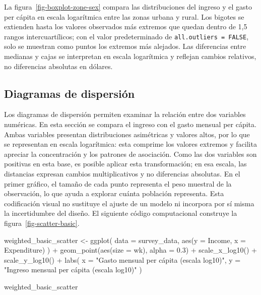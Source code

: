 \documentclass[
  spanish,
  11pt,
  letterpaper,
  oneside,
  open=any]{scrbook}
\newenvironment{Shaded}{\begin{snugshade}}{\end{snugshade}}
\newcommand{\AttributeTok}[1]{\textcolor[rgb]{0.40,0.45,0.13}{#1}}
\newcommand{\FloatTok}[1]{\textcolor[rgb]{0.68,0.00,0.00}{#1}}
\newcommand{\FunctionTok}[1]{\textcolor[rgb]{0.28,0.35,0.67}{#1}}
\newcommand{\NormalTok}[1]{\textcolor[rgb]{0.00,0.23,0.31}{#1}}
\newcommand{\OtherTok}[1]{\textcolor[rgb]{0.00,0.23,0.31}{#1}}
\newcommand{\SpecialCharTok}[1]{\textcolor[rgb]{0.37,0.37,0.37}{#1}}
\newcommand{\StringTok}[1]{\textcolor[rgb]{0.13,0.47,0.30}{#1}}
\begin{document}
La figura~\ref{fig-boxplot-zone-sex} compara las distribuciones del
ingreso y el gasto per cápita en escala logarítmica entre las zonas
urbana y rural. Los bigotes se extienden hasta los valores observados
más extremos que quedan dentro de 1,5 rangos intercuartílicos; con el
valor predeterminado de \texttt{all.outliers\ =\ FALSE}, solo se
muestran como puntos los extremos más alejados. Las diferencias entre
medianas y cajas se interpretan en escala logarítmica y reflejan cambios
relativos, no diferencias absolutas en dólares.

\subsection{Diagramas de dispersión}\label{diagramas-de-dispersion}

Los diagramas de dispersión permiten examinar la relación entre dos
variables numéricas. En esta sección se compara el ingreso con el gasto
mensual per cápita. Ambas variables presentan distribuciones asimétricas
y valores altos, por lo que se representan en escala logarítmica: esta
comprime los valores extremos y facilita apreciar la concentración y los
patrones de asociación. Como las dos variables son positivas en esta
base, es posible aplicar esta transformación; en esa escala, las
distancias expresan cambios multiplicativos y no diferencias absolutas.
En el primer gráfico, el tamaño de cada punto representa el peso
muestral de la observación, lo que ayuda a explorar cuánta población
representa. Esta codificación visual no sustituye el ajuste de un modelo
ni incorpora por sí misma la incertidumbre del diseño. El siguiente
código computacional construye la figura~\ref{fig-scatter-basic}.

\begin{Shaded}
\begin{Highlighting}[]
\NormalTok{weighted\_basic\_scatter }\OtherTok{\textless{}{-}} \FunctionTok{ggplot}\NormalTok{(}
  \AttributeTok{data =}\NormalTok{ survey\_data,}
  \FunctionTok{aes}\NormalTok{(}\AttributeTok{y =}\NormalTok{ Income, }\AttributeTok{x =}\NormalTok{ Expenditure)}
\NormalTok{) }\SpecialCharTok{+}
  \FunctionTok{geom\_point}\NormalTok{(}\FunctionTok{aes}\NormalTok{(}\AttributeTok{size =}\NormalTok{ wk), }\AttributeTok{alpha =} \FloatTok{0.3}\NormalTok{) }\SpecialCharTok{+}
  \FunctionTok{scale\_x\_log10}\NormalTok{() }\SpecialCharTok{+}
  \FunctionTok{scale\_y\_log10}\NormalTok{() }\SpecialCharTok{+}
  \FunctionTok{labs}\NormalTok{(}
    \AttributeTok{x =} \StringTok{"Gasto mensual per cápita (escala log10)"}\NormalTok{,}
    \AttributeTok{y =} \StringTok{"Ingreso mensual per cápita (escala log10)"}
\NormalTok{  )}

\NormalTok{weighted\_basic\_scatter}
\end{Highlighting}
\end{Shaded}
\end{document}
